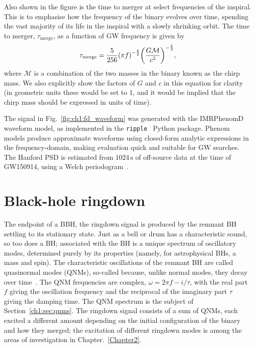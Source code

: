 Also shown in the figure is the time to merger at select frequencies of the inspiral.
This is to emphasise how the frequency of the binary evolves over time, spending the vast majority of its life in the inspiral with a slowly shrinking orbit.
The time to merger, $\tau_\mathrm{merge}$, as a function of GW frequency is given by
\begin{equation}\label{eq:time_to_merger}
    \tau_\mathrm{merge} = \frac{5}{256} \qty(\pi f)^{-\frac{8}{3}} \qty(\frac{G\mathcal{M}}{c^3})^{-\frac{5}{3}},
\end{equation}
where $\mathcal{M}$ is a combination of the two masses in the binary known as the chirp mass.
We also explicitly show the factors of $G$ and $c$ in this equation for clarity (in geometric units these would be set to 1, and it would be implied that the chirp mass should be expressed in units of time). 

The signal in Fig.~\ref{fig:ch1:fd_waveform} was generated with the IMRPhenomD~\cite{Khan:2015jqa} waveform model, as implemented in the \texttt{ripple}~\cite{Edwards:2023sak} Python package.
Phenom models produce approximate waveforms using closed-form analytic expressions in the frequency-domain, making evaluation quick and suitable for GW searches.
The Hanford PSD is estimated from $1024\,\mathrm{s}$ of off-source data at the time of GW150914, using a Welch periodogram~\cite{1161901}.


\section{Black-hole ringdown}

The endpoint of a BBH, the ringdown signal is produced by the remnant BH settling to its stationary state.
Just as a bell or drum has a characteristic sound, so too does a BH; associated with the BH is a unique spectrum of oscillatory modes, determined purely by its properties (namely, for astrophysical BHs, a mass and spin).
The characteristic oscillations of the remnant BH are called quasinormal modes (QNMs), so-called because, unlike normal modes, they decay over time~\cite{Berti:2005ys, Berti:2009kk}.
The QNM frequencies are complex, $\omega = 2\pi f - i/\tau$, with the real part $f$ giving the oscillation frequency and the reciprocal of the imaginary part $\tau$ giving the damping time. 
The QNM spectrum is the subject of Section~\ref{ch1:sec:qnms}.
The ringdown signal consists of a sum of QNMs, each excited a different amount depending on the initial configuration of the binary and how they merged; the excitation of different ringdown modes is among the areas of investigation in Chapter.~\ref{Chapter2}.

